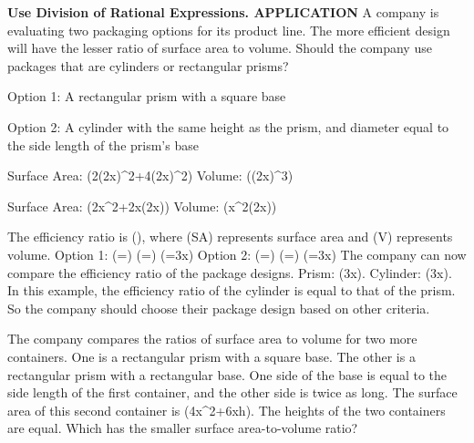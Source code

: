 \documentclass{article}
\newenvironment{example}[1]{}{}         %
\newenvironment{tryit}[1]{}{}           %
\newcommand{\answer}[1]{}               %
\newcommand{\placeholder}[2]{}          %
\newcommand{\te}[1]{}                   %
\begin{document}
\begin{example}{6}
\textbf{Use Division of Rational Expressions. APPLICATION}
A company is evaluating two packaging options for its product line. The more efficient design will have the lesser ratio of surface area to volume. Should the company use packages that are cylinders or rectangular prisms?
\placeholder{illustration}{Option 1: brown cubic cardboard package with a vertical white band extending over its top.}
Option 1: A rectangular prism with a square base
\placeholder{illustration}{Option 2: upright brown cylindrical package with a white band around the upper part and a small orange circular seal.}
Option 2: A cylinder with the same height as the prism, and diameter equal to the side length of the prism's base
\placeholder{diagram}{Cream rectangular prism in perspective, actually a cube; three mutually perpendicular edges labeled 2x in red, including its height and both base dimensions.}
Surface Area: (2(2x)^2+4(2x)^2)
Volume: ((2x)^3)
\placeholder{diagram}{Cream upright cylinder; radius of top circular face marked in red from its center to the left rim and labeled x; vertical height labeled 2x in red at right.}
Surface Area: (2\pi x^2+2\pi x(2x))
Volume: (\pi x^2(2x))
\te{STUDY TIP Recall that surface area tells how much packaging material is needed and volume tells how much product the package can hold.}
The efficiency ratio is (), where (SA) represents surface area and (V) represents volume.
Option 1:
(=)
(=)
(=\frac3x)
Option 2:
(=)
(=)
(=\frac3x)
The company can now compare the efficiency ratio of the package designs.
Prism: (\frac3x). Cylinder: (\frac3x).
In this example, the efficiency ratio of the cylinder is equal to that of the prism. So the company should choose their package design based on other criteria.
\te{Callout: Regardless of what positive value is selected for (x), the efficiency ratios for these two package designs will be the same.}
\answer{Both efficiency ratios are (\frac3x); the company should choose their package design based on other criteria.}
\end{example}
\begin{tryit}{6}
The company compares the ratios of surface area to volume for two more containers. One is a rectangular prism with a square base. The other is a rectangular prism with a rectangular base. One side of the base is equal to the side length of the first container, and the other side is twice as long. The surface area of this second container is (4x^2+6xh). The heights of the two containers are equal. Which has the smaller surface area-to-volume ratio?
\answer{The efficiency ratio for the prism with the rectangular base is less than that for the prism with the square base.}
\end{tryit}
\end{document}
